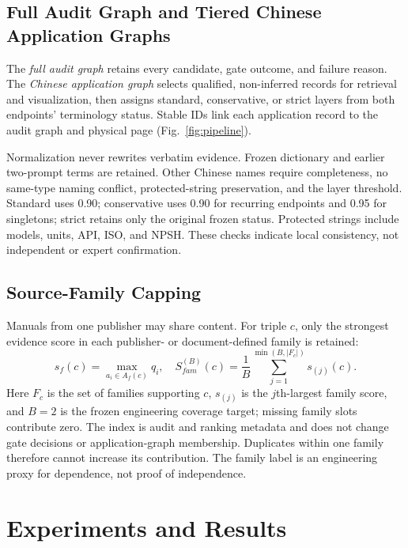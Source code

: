 \documentclass[conference,a4paper]{IEEEtran}
\begin{document}
\subsection{Full Audit Graph and Tiered Chinese Application Graphs}

The \emph{full audit graph} retains every candidate, gate outcome, and failure reason. The \emph{Chinese application graph} selects qualified, non-inferred records for retrieval and visualization, then assigns standard, conservative, or strict layers from both endpoints' terminology status. Stable IDs link each application record to the audit graph and physical page (Fig.~\ref{fig:pipeline}).

Normalization never rewrites verbatim evidence. Frozen dictionary and earlier two-prompt terms are retained. Other Chinese names require completeness, no same-type naming conflict, protected-string preservation, and the layer threshold. Standard uses 0.90; conservative uses 0.90 for recurring endpoints and 0.95 for singletons; strict retains only the original frozen status. Protected strings include models, units, API, ISO, and NPSH. These checks indicate local consistency, not independent or expert confirmation.

\subsection{Source-Family Capping}

Manuals from one publisher may share content. For triple $c$, only the strongest evidence score in each publisher- or document-defined family is retained:
\begin{equation}
s_f(c)=\max_{a_i\in A_f(c)}q_i,\quad
S_{fam}^{(B)}(c)=\frac{1}{B}\sum_{j=1}^{\min(B,|F_c|)}s_{(j)}(c).
\label{eq:family}
\end{equation}
Here $F_c$ is the set of families supporting $c$, $s_{(j)}$ is the $j$th-largest family score, and $B=2$ is the frozen engineering coverage target; missing family slots contribute zero. The index is audit and ranking metadata and does not change gate decisions or application-graph membership. Duplicates within one family therefore cannot increase its contribution. The family label is an engineering proxy for dependence, not proof of independence.

\section{Experiments and Results}
\end{document}
